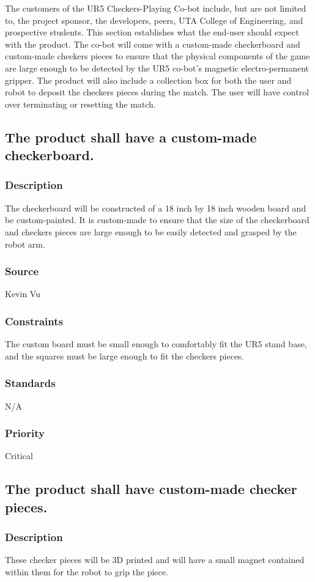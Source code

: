 The customers of the UR5 Checkers-Playing Co-bot include, but are not limited to, the project sponsor, the developers, peers, UTA College of Engineering, and prospective students. This section establishes what the end-user should expect with the product. The co-bot will come with a custom-made checkerboard and custom-made checkers pieces to ensure that the physical components of the game are large enough to be detected by the UR5 co-bot's magnetic electro-permanent gripper. The product will also include a collection box for both the user and robot to deposit the checkers pieces during the match. The user will have control over terminating or resetting the match.   

\subsection{The product shall have a custom-made checkerboard.}
\subsubsection{Description}
The checkerboard will be constructed of a 18 inch by 18 inch wooden board and be custom-painted. It is custom-made to ensure that the size of the checkerboard and checkers pieces are large enough to be easily detected and grasped by the robot arm.
\subsubsection{Source}
Kevin Vu
\subsubsection{Constraints}
The custom board must be small enough to comfortably fit the UR5 stand base, and the squares must be large enough to fit the checkers pieces.
\subsubsection{Standards}
N/A
\subsubsection{Priority}
Critical

\subsection{The product shall have custom-made checker pieces.}
\subsubsection{Description}
These checker pieces will be 3D printed and will have a small magnet contained within them for the robot to grip the piece.
